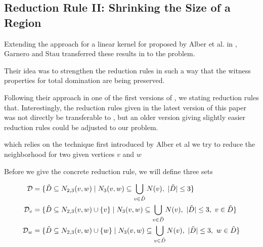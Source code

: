 
\subsection{Reduction Rule II: Shrinking the Size of a Region}


Extending the approach for a linear kernel for \dom proposed by Alber et al. in \cite{Alber2004}, Garnero and Stau transferred these results in \cite{Garnero2018} to the \tdom problem. 

Their idea was to strengthen the reduction rules in such a way that the witness properties for total domination are being preserved.

Following their approach in one of the first versions of \cite{Garnero2014}, we stating reduction rules that. Interestingly, the reduction rules given in the latest version of this paper was not directly be transferable to \sdom, but an older version giving slightly easier reduction rules could be adjusted to our problem.

which relies on the technique first introduced by Alber et al we try to reduce the neighborhood for two given vertices $v$ and $w$

Before we give the concrete reduction rule, we will define three sets 

\begin{align}
    \mathcal{D} & = \{ \tilde D \subseteq N_{2,3}(v,w)            \mid N_3(v,w) \subseteq \bigcup_{v \in \tilde D} N(v),\ |\tilde D| \leq 3                  \} \\
    \mathcal{D}_{v}  & = \{ \tilde D \subseteq N_{2,3}(v,w) \cup \{v\} \mid N_3(v,w) \subseteq \bigcup_{v \in \tilde D} N(v),\ |\tilde D| \leq 3,\ v \in \tilde D \} \\
    \mathcal{D}_{w}  & = \{ \tilde D \subseteq N_{2,3}(v,w) \cup \{w\} \mid N_3(v,w) \subseteq \bigcup_{v \in \tilde D} N(v),\ |\tilde D| \leq 3,\ w \in \tilde D \}
\end{align}


